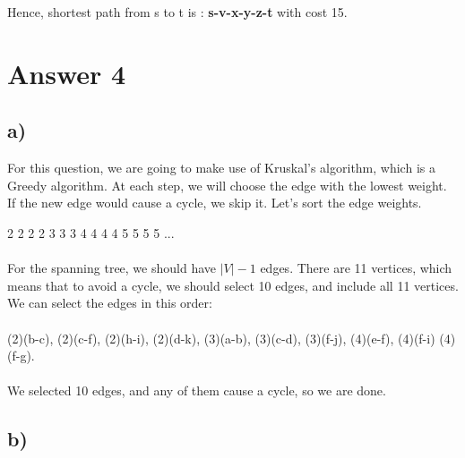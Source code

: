 \documentclass[12pt]{article}
\begin{document}
Hence, shortest path from s to t is : \textbf{s-v-x-y-z-t} with cost 15.
\section*{Answer 4}
\subsection*{a) }

For this question, we are going to make use of Kruskal's algorithm, which is a Greedy algorithm. At each step, we will choose the edge with the lowest weight. If the new edge would cause a cycle, we skip it. Let's sort the edge weights.

2 2 2 2 3 3 3 4 4 4 4 5 5 5 5 ... \\\\

For the spanning tree, we should have $|V|-1$ edges. There are 11 vertices, which means that to avoid a cycle, we should select 10 edges, and include all 11 vertices.\\

We can select the edges in this order:\\\\

(2)(b-c), (2)(c-f), (2)(h-i), (2)(d-k), (3)(a-b), (3)(c-d), (3)(f-j), (4)(e-f), (4)(f-i) (4)(f-g).\\\\

We selected 10 edges, and any of them cause a cycle, so we are done.

\subsection*{b) }
\end{document}
